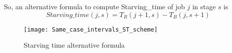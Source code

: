 So, an alternative formula to compute Starving\_time of job $j$ in stage $s$ is
\[Starving\_time(j,s)=T_R(j+1,s)-T_B(j,s+1)\]
\begin{figure}[H] 
\centering    
\texttt{[image: Same\_case\_intervals\_ST\_scheme]}
\caption[Starving time formula visualization]{Starving time alternative formula}
\label{fig:Starving time formula visualization}
\end{figure}
